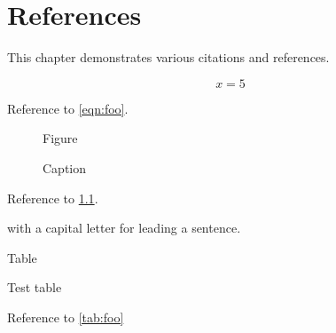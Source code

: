 \chapter{References}

This chapter demonstrates various citations and references.

\begin{equation}\label{eqn:foo}
  x = 5
\end{equation}

Reference to \cref{eqn:foo}.

\begin{figure}[h!]
  \centering
  Figure
  \caption{Caption}
  \label{fig:foo}
\end{figure}

Reference to \cref{fig:foo}.

 with a capital letter for leading a sentence.

\begin{table}[h!]
  \centering
  Table
  \caption{Test table}
  \label{tab:foo}
\end{table}

Reference to \cref{tab:foo}

